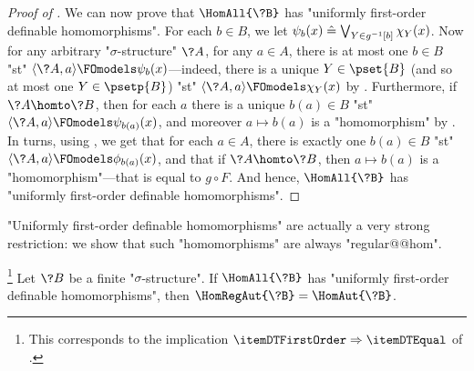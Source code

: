\begin{proof}[Proof of ]
	We can now prove that
	$\HomAll{\?B}$ has "uniformly first-order definable homomorphisms".
	For each $b\in B$, we let $\psi_b(x) \mathrel{\hat{=}} \bigvee_{Y \in g^{-1}[b]} \chi_Y(x)$.
	Now for any arbitrary "$\sigma$-structure" $\?A$, for any $a\in A$,
	there is at most one $b\in B$ "st" $\langle \?A, a \rangle \FOmodels \psi_b(x)$---indeed,
	there is a unique $Y \in \pset{B}$ (and so at most one $Y \in \psetp{B}$) "st"
	$\langle \?A, a \rangle \FOmodels \chi_Y(x)$ by
	.
	Furthermore, if $\?A \homto \?B$, then for each $a$ there is a unique $b(a) \in B$
	"st" $\langle \?A, a \rangle \FOmodels \psi_{b(a)}(x)$, and moreover $a \mapsto b(a)$
	is a "homomorphism" by 
	.
	In turns, using ,
	we get that for each $a\in A$, there is exactly one $b(a) \in B$ "st" $\langle \?A, a \rangle \FOmodels \phi_{b(a)}(x)$, and that if
	$\?A \homto \?B$, then $a \mapsto b(a)$ is a "homomorphism"---that is equal to
	$g \circ F$. And hence, $\HomAll{\?B}$
	has "uniformly first-order definable homomorphisms".
\end{proof}

"Uniformly first-order definable homomorphisms" are actually a very strong restriction:
we show that such "homomorphisms" are always "regular@@hom".
\begin{proposition}
	\!\footnote{This corresponds to the implication $\itemDTFirstOrder \Rightarrow \itemDTEqual$
	of .}
	\AP\label{prop:uniformly-first-order-implies-regular}
	Let $\?B$ be a finite "$\sigma$-structure".
	If $\HomAll{\?B}$ has "uniformly first-order definable homomorphisms",
	then $\HomRegAut{\?B} = \HomAut{\?B}$.
\end{proposition}

